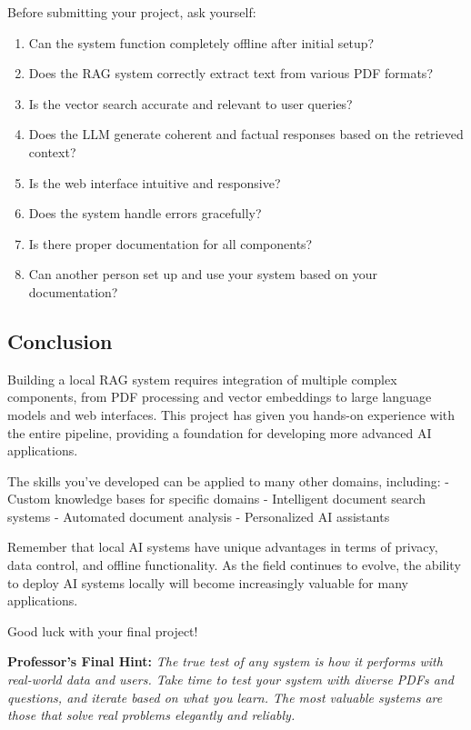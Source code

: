 \documentclass[
  screen,review,acmlarge]{acmart}
\providecommand{\tightlist}{%
  \setlength{\itemsep}{0pt}\setlength{\parskip}{0pt}}
\begin{document}
Before submitting your project, ask yourself:

\begin{enumerate}
\def\labelenumi{\arabic{enumi}.}
\tightlist
\item
  Can the system function completely offline after initial setup?
\item
  Does the RAG system correctly extract text from various PDF formats?
\item
  Is the vector search accurate and relevant to user queries?
\item
  Does the LLM generate coherent and factual responses based on the retrieved context?
\item
  Is the web interface intuitive and responsive?
\item
  Does the system handle errors gracefully?
\item
  Is there proper documentation for all components?
\item
  Can another person set up and use your system based on your documentation?
\end{enumerate}

\subsection{Conclusion}\label{conclusion}

Building a local RAG system requires integration of multiple complex components, from PDF processing and vector embeddings to large language models and web interfaces. This project has given you hands-on experience with the entire pipeline, providing a foundation for developing more advanced AI applications.

The skills you've developed can be applied to many other domains, including:
- Custom knowledge bases for specific domains
- Intelligent document search systems
- Automated document analysis
- Personalized AI assistants

Remember that local AI systems have unique advantages in terms of privacy, data control, and offline functionality. As the field continues to evolve, the ability to deploy AI systems locally will become increasingly valuable for many applications.

Good luck with your final project!

\textbf{Professor's Final Hint:} \emph{The true test of any system is how it performs with real-world data and users. Take time to test your system with diverse PDFs and questions, and iterate based on what you learn. The most valuable systems are those that solve real problems elegantly and reliably.}
\end{document}
